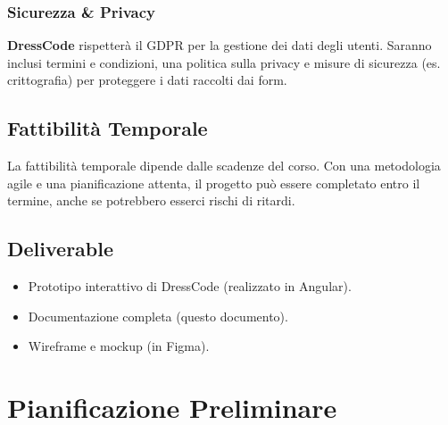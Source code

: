 \documentclass[11pt]{article}
\begin{document}
\subsubsection{Sicurezza \& Privacy}
\textbf{DressCode} rispetterà il GDPR per la gestione dei dati degli utenti. Saranno inclusi termini e condizioni, una politica sulla privacy e misure di sicurezza (es. crittografia) per proteggere i dati raccolti dai form.

\subsection{Fattibilità Temporale}
La fattibilità temporale dipende dalle scadenze del corso. Con una metodologia agile e una pianificazione attenta, il progetto può essere completato entro il termine, anche se potrebbero esserci rischi di ritardi.

\subsection{Deliverable}
\begin{itemize}
  \item Prototipo interattivo di DressCode (realizzato in Angular).
  \item Documentazione completa (questo documento).
  \item Wireframe e mockup (in Figma).
\end{itemize}

\section{\huge Pianificazione Preliminare}
\end{document}
